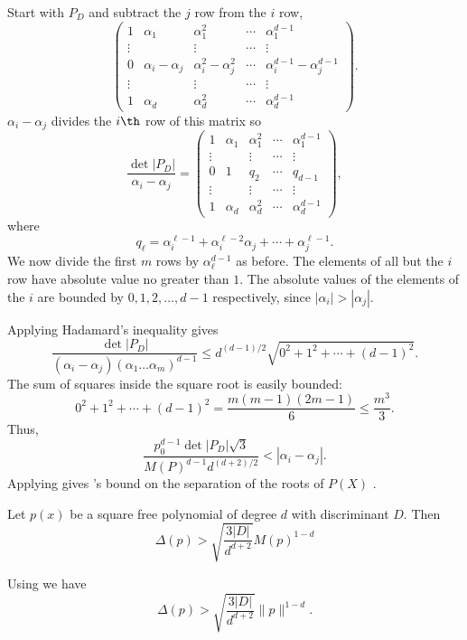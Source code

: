 Start with $P_D$ and subtract the $j${\th} row from the $i${\th} row,
\[
\left(\begin{array}{ccccccc}
1 & \alpha_1 & \alpha_1^2 & \cdots & \alpha_1^{d-1} \\
\vdots & & \vdots & \cdots & \vdots \\
0 & \alpha_i - \alpha_j & \alpha_i^2 - \alpha_j^2 & \cdots &
\alpha_i^{d-1} - \alpha_j^{d-1} \\
\vdots & & \vdots & \cdots & \vdots \\
1 & \alpha_d & \alpha_d^2 & \cdots & \alpha_d^{d-1} 
\end{array}\right).
\]
$\alpha_i - \alpha_j$ divides the $i{\th}$ row of this matrix so
\[
\frac{\det|P_D|}{\alpha_i - \alpha_j} = 
\left(\begin{array}{ccccccc}
1 & \alpha_1 & \alpha_1^2 & \cdots & \alpha_1^{d-1} \\
\vdots & & \vdots & \cdots & \vdots \\
0 & 1 & q_2 & \cdots & q_{d-1} \\
\vdots & & \vdots & \cdots & \vdots \\
1 & \alpha_d & \alpha_d^2 & \cdots & \alpha_d^{d-1} 
\end{array}\right),
\]
where 
\[
q_{\ell} = \alpha_i^{\ell-1} + \alpha_i^{\ell -2} \alpha_j + \cdots +
\alpha_j^{\ell-1}.
\]
We now divide the first $m$ rows by $\alpha_{\ell}^{d-1}$ as before.
The elements of all but the $i${\th} row have absolute value no
greater than $1$.  The absolute values of the elements of the $i${\th}
are bounded by $0, 1, 2, \ldots, {d-1}$ respectively, since
$|\alpha_i| > |\alpha_j|$.  

Applying Hadamard's inequality gives
\[
\frac{\det|P_D|}{(\alpha_i - \alpha_j) (\alpha_1 \ldots
\alpha_m)^{d-1}} 
\le d^{(d-1)/2}\sqrt{0^2 + 1^2 + \cdots + (d-1)^2}.
\]
The sum of squares inside the square root is easily bounded:
\[
0^2 + 1^2 + \cdots + (d-1)^2 = \frac{m(m-1)(2m-1)}{6} \le
\frac{m^3}{3}.
\]
Thus,
\[
\frac{p_0^{d-1} \det|P_D| \sqrt{3}}{M(P)^{d-1} d^{(d+2)/2}} 
   < |\alpha_i - \alpha_j|.
\]
Applying  gives {\Mahler}'s bound on the separation of the roots of $P(X)$ \cite{Mahler64}.

\begin{proposition}[{\Mahler}]
Let $p(x)$ be a square free polynomial of degree $d$ with discriminant $D$.
Then
\[
\Delta(p) > \sqrt{\frac{3 |D|}{d^{d+2}}} M(p)^{1-d}
\]
\end{proposition}

Using  we have
\[
\Delta(p) > \sqrt{\frac{3 |D|}{d^{d+2}}} \|p\|^{1-d}.
\]

